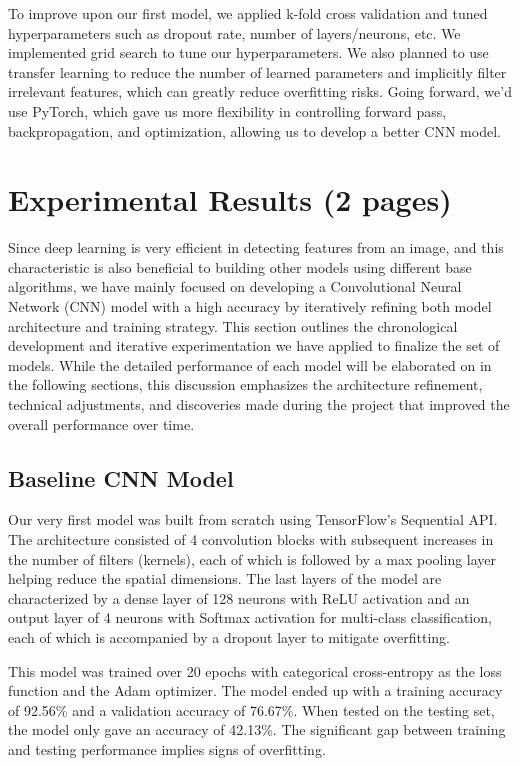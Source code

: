 \documentclass[conference]{IEEEtran}
\begin{document}
To improve upon our first model, we applied k-fold cross validation and tuned hyperparameters such as dropout rate, number of layers/neurons, etc. We implemented grid search to tune our hyperparameters. We also planned to use transfer learning to reduce the number of learned parameters and implicitly filter irrelevant features, which can greatly reduce overfitting risks. Going forward, we'd use PyTorch, which gave us more flexibility in controlling forward pass, backpropagation, and optimization, allowing us to develop a better CNN model.

\section{\large Experimental Results (2 pages)}
Since deep learning is very efficient in detecting features from an image,
and this characteristic is also beneficial to building other models using different base algorithms, 
we have mainly focused on developing a Convolutional Neural Network (CNN) model with a high accuracy by iteratively refining both model architecture and training strategy. This section outlines the chronological development and iterative experimentation we have applied to finalize the set of models. 
While the detailed performance of each model will be elaborated on in the following sections, this discussion emphasizes the architecture refinement, technical adjustments, and discoveries made during the project that improved the overall performance over time.
\subsection{\large Baseline CNN Model}
Our very first model was built from scratch using TensorFlow’s Sequential API. 
The architecture consisted of 4 convolution blocks with subsequent increases in the number of filters (kernels), 
each of which is followed by a max pooling layer helping reduce the spatial dimensions. 
The last layers of the model are characterized by a dense layer of 128 neurons with ReLU activation and an output layer of 4 neurons with Softmax activation for multi-class classification, each of which is accompanied by a dropout layer to mitigate overfitting. \

This model was trained over 20 epochs with categorical cross-entropy as the loss function and the Adam optimizer. 
The model ended up with a training accuracy of 92.56\% and a validation accuracy of 76.67\%. 
When tested on the testing set, the model only gave an accuracy of 42.13\%. The significant gap between training and testing performance implies signs of overfitting.
\end{document}
